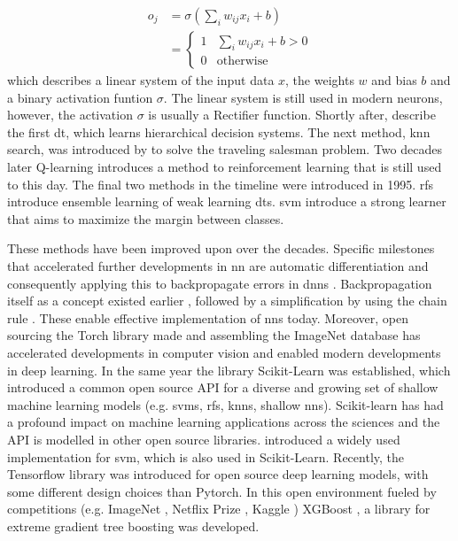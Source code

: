 \begin{equation}
\begin{array}{ll}
    o_{j} & = \sigma \left(\sum_i w_{ij} x_{i} + b\right)\\
    & = \begin{cases}1&\sum_i w_{ij} x_{i} + b > 0 \\ 0 &\text{otherwise}   \end{cases}
\end{array}
\end{equation}
which describes a linear system of the input data $x$, the weights $w$ and bias $b$ and a binary activation funtion $\sigma$. The linear system is still used in modern neurons, however, the activation $\sigma$ is usually a Rectifier function. Shortly after, \citet{belson1959matching} describe the first \acf{dt}, which learns hierarchical decision systems. The next method, \ac{knn} search, was introduced by \citet{cover1967nearest} to solve the traveling salesman problem. Two decades later Q-learning \citep{watkins1989learning} introduces a method to reinforcement learning that is still used to this day. The final two methods in the timeline were introduced in 1995. \acfp{rf} \citep{ho1995random} introduce ensemble learning of weak learning \acfp{dt}. \acf{svm} \citep{cortes1995support} introduce a strong learner that aims to maximize the margin between classes.

These methods have been improved upon over the decades. Specific milestones that accelerated further developments in \ac{nn} are automatic differentiation \citep{linnainmaa1970representation} and consequently applying this to backpropagate errors in \acp{dnn} \citep{rumelhart1988learning}. Backpropagation itself as a concept existed earlier \citep{kelley1960gradient, bryson1961gradient}, followed by a simplification by using the chain rule \citep{dreyfus1962numerical}. These enable effective implementation of \acp{nn} today. Moreover, open sourcing the Torch library \citep{collobert2002torch} made and assembling the ImageNet database \citep{deng2009imagenet} has accelerated developments in computer vision and enabled modern developments in deep learning. In the same year the library Scikit-Learn \citep{scikit-learn} was established, which introduced a common open source API \citep{sklearn_api} for a diverse and growing set of shallow machine learning models (e.g. \acp{svm}, \acp{rf}, \acp{knn}, shallow \acp{nn}). Scikit-learn has had a profound impact on machine learning applications across the sciences and the API is modelled in other open source libraries. \citet{libsvm} introduced a widely used implementation for \acf{svm}, which is also used in Scikit-Learn. Recently, the Tensorflow library \citep{tensorflow} was introduced for open source deep learning models, with some different design choices than Pytorch. In this open environment fueled by competitions (e.g. ImageNet \citep{ILSVRCanalysis_ICCV2013}, Netflix Prize \citep{bennett2007netflix}, Kaggle \citep{goodfellow2013challenges}) XGBoost \citep{xgboost}, a library for extreme gradient tree boosting was developed.


